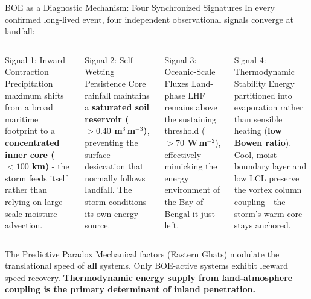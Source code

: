 \documentclass[aspectratio=169,t,xcolor=table]{beamer}
\begin{document}
\begin{frame}{BOE as a Diagnostic Mechanism: Four Synchronized Signatures}
  \footnotesize
  In every confirmed long-lived event, four independent
  observational signals converge at landfall:

  \begin{columns}
    \begin{block}{\small Signal 1: Inward Contraction}
      \footnotesize
      Precipitation maximum shifts from a broad maritime footprint
      to a \textbf{concentrated inner core ($<100$ km)} - the storm feeds
      itself rather than relying on large-scale moisture advection.
    \end{block}

    \vspace{0.2cm}

    \begin{block}{\small Signal 2: Self-Wetting Persistence}
      \footnotesize
      Core rainfall maintains a \textbf{saturated soil reservoir
      ($>0.40$ m$^3$\,m$^{-3}$)}, preventing the surface desiccation that
      normally follows landfall. The storm conditions its own energy source.
    \end{block}

    \begin{block}{\small Signal 3: Oceanic-Scale Fluxes}
      \footnotesize
      Land-phase LHF remains above the sustaining threshold
      (\textbf{$>70$ W\,m$^{-2}$}), effectively mimicking the energy
      environment of the Bay of Bengal it just left.
    \end{block}

    \vspace{0.2cm}

    \begin{block}{\small Signal 4: Thermodynamic Stability}
      \footnotesize
      Energy partitioned into evaporation rather than sensible
      heating (\textbf{low Bowen ratio}). Cool, moist boundary layer and
      low LCL preserve the vortex column coupling - the storm's warm core
      stays anchored.
    \end{block}
  \end{columns}

  \vspace{0.2cm}
  \begin{alertblock}{\small The Predictive Paradox}
    \footnotesize
    Mechanical factors (Eastern Ghats) modulate the translational
    speed of \textbf{all} systems. Only BOE-active systems exhibit
    leeward speed recovery. \textbf{Thermodynamic energy supply from
    land-atmosphere coupling is the primary determinant of inland penetration.}
  \end{alertblock}
\end{frame}
\end{document}
